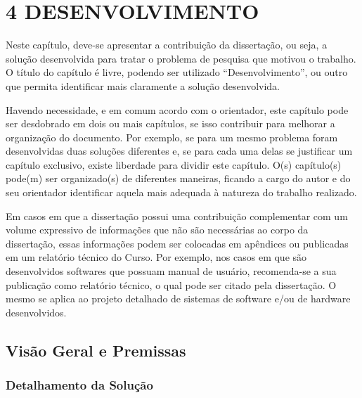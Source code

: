 \chapter{4  DESENVOLVIMENTO}
\label{c_cap4}

Neste capítulo, deve-se apresentar a contribuição da dissertação, ou seja, a solução desenvolvida para tratar o problema de pesquisa que motivou o trabalho. O título do capítulo é livre, podendo ser utilizado “Desenvolvimento”, ou outro que permita identificar mais claramente a solução desenvolvida.

Havendo necessidade, e em comum acordo com o orientador, este capítulo pode ser desdobrado em dois ou mais capítulos, se isso contribuir para melhorar a organização do documento. Por exemplo, se para um mesmo problema foram desenvolvidas duas soluções diferentes e, se para cada uma delas se justificar um capítulo exclusivo, existe liberdade para dividir este capítulo. O(s) capítulo(s) pode(m) ser organizado(s) de diferentes maneiras, ficando a cargo do autor e do seu orientador identificar aquela mais adequada à natureza do trabalho realizado. 

Em casos em que a dissertação possui uma contribuição complementar com um volume expressivo de informações que não são necessárias ao corpo da dissertação, essas informações podem ser colocadas em apêndices ou publicadas em um relatório técnico do Curso. Por exemplo, nos casos em que são desenvolvidos softwares que possuam manual de usuário, recomenda-se a sua publicação como relatório técnico, o qual pode ser citado pela dissertação. O mesmo se aplica ao projeto detalhado de sistemas de software e/ou de hardware desenvolvidos.



\section{Visão Geral e Premissas}
\label{s_c4_visao_geral}





\subsection{Detalhamento da Solução}
\label{ss_c4_detalhamento_mGov-BR}




